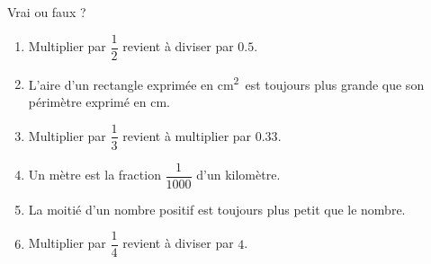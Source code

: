 
\begin{exercice}\label{exosmath-0879}

    Vrai ou faux ?
    \begin{enumerate}
        \item
            Multiplier par \( \dfrac{ 1 }{ 2 }\) revient à diviser par \( 0.5\).
        \item
            L'aire d'un rectangle exprimée en \si{\centi\meter\squared}\ est toujours plus grande que son périmètre exprimé en \si{\centi\meter}.
        \item
            Multiplier par \( \dfrac{ 1 }{ 3 }\) revient à multiplier par \( 0.33\).
        \item
            Un mètre est la fraction \( \dfrac{ 1 }{ 1000 }\) d'un kilomètre.
        \item
            La moitié d'un nombre positif est toujours plus petit que le nombre.
        \item
            Multiplier par \( \dfrac{ 1 }{ 4 }\) revient à diviser par \( 4 \).
    \end{enumerate}

\end{exercice}
